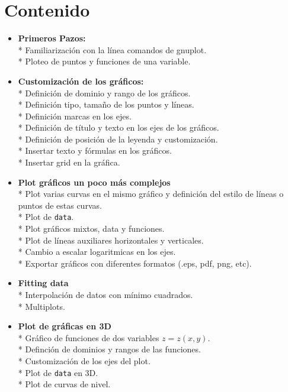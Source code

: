 \documentclass[11.5pt,a4paper]{article}
\begin{document}
\newpage
\section{Contenido}

\begin{itemize}
\item \textbf{Primeros Pazos:}\\* 
Familiarización con la línea comandos de gnuplot.\\*
Ploteo de puntos y funciones de una variable.

\item \textbf{Customización de los gráficos:}\\*
Definición de dominio y rango de los gráficos.\\*
Definición tipo, tamaño de los puntos y líneas.\\*
Definición marcas en los ejes.\\*
Definición de título y texto en los ejes de los gráficos.\\*
Definición de posición de la leyenda y customización.\\*
Insertar texto y fórmulas en los gráficos.\\*
Insertar grid en la gráfica.

\item \textbf{Plot gráficos un poco más complejos}\\*
Plot varias curvas en el mismo gráfico y definición del estilo de líneas o puntos de estas curvas.\\*
Plot de \texttt{data}.\\*
Plot gráficos mixtos, data y funciones.\\*
Plot de líneas auxiliares horizontales y verticales.\\*
Cambio a escalar logaritmicas en los ejes.\\*
Exportar gráficos con diferentes formatos (.eps, pdf, png, etc).

\item \textbf{Fitting data}\\*
Interpolación de datos con mínimo cuadrados.\\*
Multiplots.

\item \textbf{Plot de gráficas en 3D}\\*
Gráfico de funciones de dos variables $z = z(x,y)$.\\*
Definción de dominios y rangos de las funciones.\\*
Customización de los ejes del plot.\\*
Plot de \texttt{data} en 3D.\\*
Plot de curvas de nivel.


\end{itemize}
\end{document}
